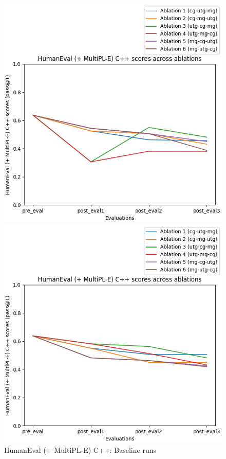 % 
\begin{figure}[H]
    \centering
    \begin{minipage}{0.45\textwidth}
        \centering
        \includegraphics[width=1.1\textwidth]{Figures/results/code_baseline_graphs/human_eval/seed_averaged_humaneval_cpp_eval_baseline.png} %
        \captionsetup{width=1.1\textwidth}
        \caption{HumanEval (+ MultiPL-E) C++: Baseline runs}
        \label{fig:CppAblationBaseline}
    \end{minipage}\hfill
    \begin{minipage}{0.45\textwidth}
        \centering
        \includegraphics[width=1.1\textwidth]{Figures/results/code_mitigation_graphs/human_eval/seed_averaged_humaneval_cpp_eval_mitigation.png} %

\end{minipage}
\end{figure}
